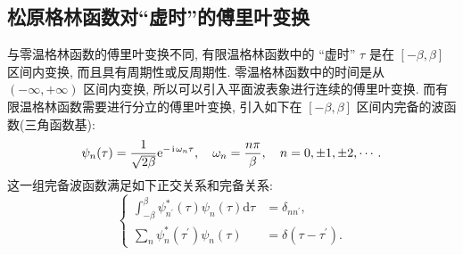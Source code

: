 \subsection{松原格林函数对“虚时”的傅里叶变换}
与零温格林函数的傅里叶变换不同, 有限温格林函数中的 “虚时” $\tau$ 是在 $[-\beta, \beta]$ 区间内变换, 而且具有周期性或反周期性. 零温格林函数中的时间是从 $(-\infty,+\infty)$ 区间内变换, 所以可以引入平面波表象进行连续的傅里叶变换. 而有限温格林函数需要进行分立的傅里叶变换, 引入如下在 $[-\beta, \beta]$ 区间内完备的波函数(三角函数基):
\begin{equation}
\psi_n(\tau)=\frac{1}{\sqrt{2 \beta}} \mathrm{e}^{-\hspace{0.1em}\mathrm{i}\hspace{0.1em} \omega_n \tau}, \quad \omega_n=\frac{n \pi}{\beta}, \quad n=0, \pm 1, \pm 2, \cdots .
\end{equation}
这一组完备波函数满足如下正交关系和完备关系:
\begin{equation}
\left\{\begin{aligned}
\int_{-\beta}^\beta \psi_{n^{\prime}}^*(\tau) \psi^{}_n(\tau) \mathrm{d} \tau & =\delta_{n n^{\prime}}, \\
\sum_n \psi_n^*\left(\tau^{\prime}\right) \psi^{}_n(\tau) & =\delta\left(\tau-\tau^{\prime}\right) .
\end{aligned}\right.
\end{equation}

